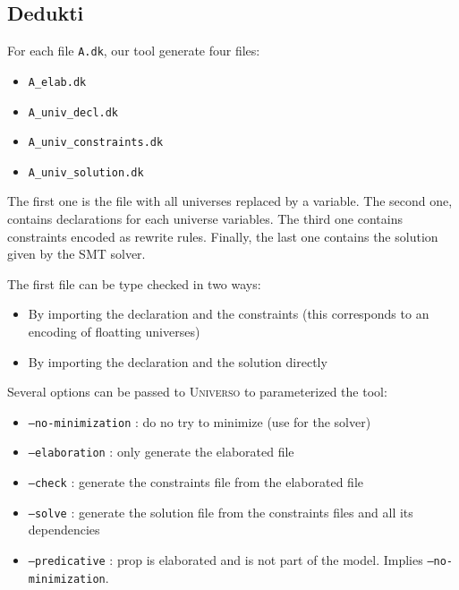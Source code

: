 \documentclass[conference]{IEEEtran}
\newcommand{\universo}{\textsc{Universo}}
\begin{document}
\subsection{Dedukti}
For each file \texttt{A.dk}, our tool generate four files:
\begin{itemize}
\item \texttt{A_elab.dk}
\item \texttt{A_univ_decl.dk}
\item \texttt{A_univ_constraints.dk}
\item \texttt{A_univ_solution.dk}
\end{itemize}

The first one is the file with all universes replaced by a variable. The second one, contains declarations for each universe variables. The third one contains constraints encoded as rewrite rules.
Finally, the last one contains the solution given by the SMT solver.

The first file can be type checked in two ways:
\begin{itemize}
\item By importing the declaration and the constraints (this corresponds to an encoding of floatting universes)
\item By importing the declaration and the solution directly
\end{itemize}

Several options can be passed to \universo{} to parameterized the tool:
\begin{itemize}
\item \texttt{--no-minimization} : do no try to minimize (use for the solver)
\item \texttt{--elaboration} : only generate the elaborated file
\item \texttt{--check} : generate the constraints file from the elaborated file
\item \texttt{--solve} : generate the solution file from the constraints files and all its dependencies
\item \texttt{--predicative} : prop is elaborated and is not part of the model. Implies \texttt{--no-minimization}.
\end{itemize}
\end{document}
